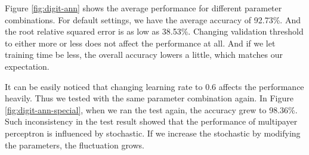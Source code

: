 \documentclass[11pt]{article}
\begin{document}
Figure \ref{fig:digit-ann} shows the average performance for different parameter combinations. For default settings, we have the average accuracy of 92.73\%. And the root relative squared error is as low as 38.53\%. Changing validation threshold to either more or less does not affect the performance at all. And if we let training time be less, the overall accuracy lowers a little, which matches our expectation.

It can be easily noticed that changing learning rate to 0.6 affects the performance heavily. Thus we tested with the same parameter combination again. In Figure \ref{fig:digit-ann-special}, when we ran the test again, the accuracy grew to 98.36\%. Such inconsistency in the test result showed that the performance of multipayer perceptron is influenced by stochastic. If we increase the stochastic by modifying the parameters, the fluctuation grows.
\end{document}
